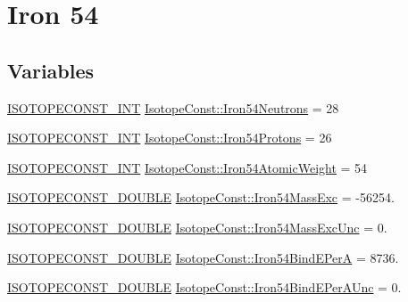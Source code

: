 \hypertarget{group___isotope_const-_iron-_fe54}{}\section{Iron 54}
\label{group___isotope_const-_iron-_fe54}
\subsection*{Variables}
\begin{DoxyCompactItemize}
\item 
\mbox{\hyperlink{group___isotope_const-_macros_ga5f18360b3e99483a35c32d789e62621c}{I\+S\+O\+T\+O\+P\+E\+C\+O\+N\+S\+T\+\_\+\+I\+NT}} \mbox{\hyperlink{group___isotope_const-_iron-_fe54_gaf6078120c701617d0e1de718d68d6d88}{Isotope\+Const\+::\+Iron54\+Neutrons}} = 28
\item 
\mbox{\hyperlink{group___isotope_const-_macros_ga5f18360b3e99483a35c32d789e62621c}{I\+S\+O\+T\+O\+P\+E\+C\+O\+N\+S\+T\+\_\+\+I\+NT}} \mbox{\hyperlink{group___isotope_const-_iron-_fe54_gaa4b9156113b2c8b5f233479f5d965ba8}{Isotope\+Const\+::\+Iron54\+Protons}} = 26
\item 
\mbox{\hyperlink{group___isotope_const-_macros_ga5f18360b3e99483a35c32d789e62621c}{I\+S\+O\+T\+O\+P\+E\+C\+O\+N\+S\+T\+\_\+\+I\+NT}} \mbox{\hyperlink{group___isotope_const-_iron-_fe54_ga70d668d471ccde02d2301fb72d22046e}{Isotope\+Const\+::\+Iron54\+Atomic\+Weight}} = 54
\item 
\mbox{\hyperlink{group___isotope_const-_macros_ga8f45a7272ce02c0b4c65c44636ed719a}{I\+S\+O\+T\+O\+P\+E\+C\+O\+N\+S\+T\+\_\+\+D\+O\+U\+B\+LE}} \mbox{\hyperlink{group___isotope_const-_iron-_fe54_ga44b544dc5126857a6e4e7a91f778e51b}{Isotope\+Const\+::\+Iron54\+Mass\+Exc}} = -\/56254.
\item 
\mbox{\hyperlink{group___isotope_const-_macros_ga8f45a7272ce02c0b4c65c44636ed719a}{I\+S\+O\+T\+O\+P\+E\+C\+O\+N\+S\+T\+\_\+\+D\+O\+U\+B\+LE}} \mbox{\hyperlink{group___isotope_const-_iron-_fe54_gadf4a3c9f8ffc119ce45ee90b3c409bbf}{Isotope\+Const\+::\+Iron54\+Mass\+Exc\+Unc}} = 0.
\item 
\mbox{\hyperlink{group___isotope_const-_macros_ga8f45a7272ce02c0b4c65c44636ed719a}{I\+S\+O\+T\+O\+P\+E\+C\+O\+N\+S\+T\+\_\+\+D\+O\+U\+B\+LE}} \mbox{\hyperlink{group___isotope_const-_iron-_fe54_ga8fd9fa1bd54a2e51a335859dca9ef556}{Isotope\+Const\+::\+Iron54\+Bind\+E\+PerA}} = 8736.
\item 
\mbox{\hyperlink{group___isotope_const-_macros_ga8f45a7272ce02c0b4c65c44636ed719a}{I\+S\+O\+T\+O\+P\+E\+C\+O\+N\+S\+T\+\_\+\+D\+O\+U\+B\+LE}} \mbox{\hyperlink{group___isotope_const-_iron-_fe54_gae64e84c13d7ae166a263c79616711952}{Isotope\+Const\+::\+Iron54\+Bind\+E\+Per\+A\+Unc}} = 0.

\end{DoxyCompactItemize}

